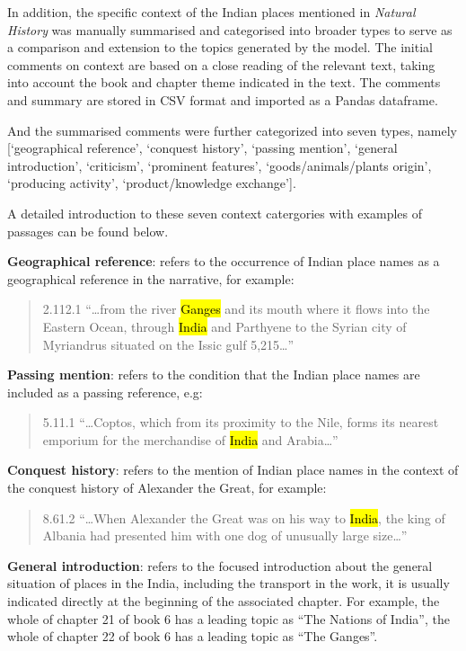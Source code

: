 \documentclass[
  12pt,
]{article}
\begin{document}
In addition, the specific context of the Indian places mentioned in
\emph{Natural History} was manually summarised and categorised into
broader types to serve as a comparison and extension to the topics
generated by the model. The initial comments on context are based on a
close reading of the relevant text, taking into account the book and
chapter theme indicated in the text. The comments and summary are stored
in CSV format and imported as a Pandas dataframe.

And the summarised comments were further categorized into seven types,
namely {[}`geographical reference', `conquest history', `passing
mention', `general introduction', `criticism', `prominent features',
`goods/animals/plants origin', `producing activity', `product/knowledge
exchange'{]}.

A detailed introduction to these seven context catergories with examples
of passages can be found below.

\textbf{Geographical reference}: refers to the occurrence of Indian
place names as a geographical reference in the narrative, for example:

\begin{quote}
2.112.1 ``\ldots from the river \hl{Ganges} and its mouth where it flows
into the Eastern Ocean, through \hl{India} and Parthyene to the Syrian
city of Myriandrus situated on the Issic gulf 5,215\ldots{}''
\end{quote}

\textbf{Passing mention}: refers to the condition that the Indian place
names are included as a passing reference, e.g:

\begin{quote}
5.11.1 ``\ldots Coptos, which from its proximity to the Nile, forms its
nearest emporium for the merchandise of \hl{India} and Arabia\ldots{}''
\end{quote}

\textbf{Conquest history}: refers to the mention of Indian place names
in the context of the conquest history of Alexander the Great, for
example:

\begin{quote}
8.61.2 ``\ldots When Alexander the Great was on his way to \hl{India},
the king of Albania had presented him with one dog of unusually large
size\ldots{}''
\end{quote}

\textbf{General introduction}: refers to the focused introduction about
the general situation of places in the India, including the transport in
the work, it is usually indicated directly at the beginning of the
associated chapter. For example, the whole of chapter 21 of book 6 has a
leading topic as ``The Nations of India'', the whole of chapter 22 of
book 6 has a leading topic as ``The Ganges''.
\end{document}
